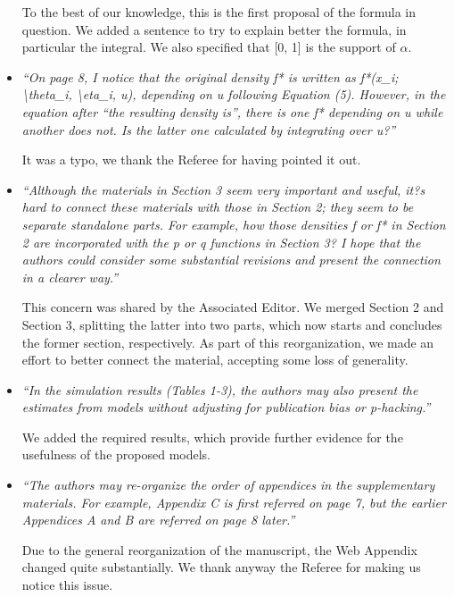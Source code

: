 \documentclass[11pt]{article}
\begin{document}
\begin{itemize}
To the best of our knowledge, this is the first proposal of the formula in question. We added a sentence to try to explain better the formula, in particular the integral. We also specified that [0, 1] is the support of $\alpha$.



\item \emph{``On page 8, I notice that the original density f* is written as f*(x\_i; \textbackslash theta\_i, \textbackslash eta\_i, u), depending on u following Equation (5). However, in the equation after ``the resulting density is'', there is one f* depending on u while another does not. Is the latter one calculated by integrating over u?''}


It was a typo, we thank the Referee for having pointed it out.



\item \emph{``Although the materials in Section 3 seem very important and useful, it?s hard to connect these materials with those in Section 2; they seem to be separate standalone parts. For example, how those densities f or f* in Section 2 are incorporated with the p or q functions in Section 3? I hope that the authors could consider some substantial revisions and present the connection in a clearer way.''}


This concern was shared by the Associated Editor. We merged Section 2 and Section 3, splitting the latter into two parts, which now starts and concludes the former section, respectively. As part of this reorganization, we made an effort to better connect the material, accepting some loss of generality.



\item \emph{``In the simulation results (Tables 1-3), the authors may also present the estimates from models without adjusting for publication bias or p-hacking.''}


We added the required results, which provide further evidence for the usefulness of the proposed models.



\item \emph{``The authors may re-organize the order of appendices in the supplementary materials. For example, Appendix C is first referred on page 7, but the earlier Appendices A and B are referred on page 8 later.''}


Due to the general reorganization of the manuscript, the Web Appendix changed quite substantially. We thank anyway the Referee for making us notice this issue.


\end{itemize}
\end{document}
